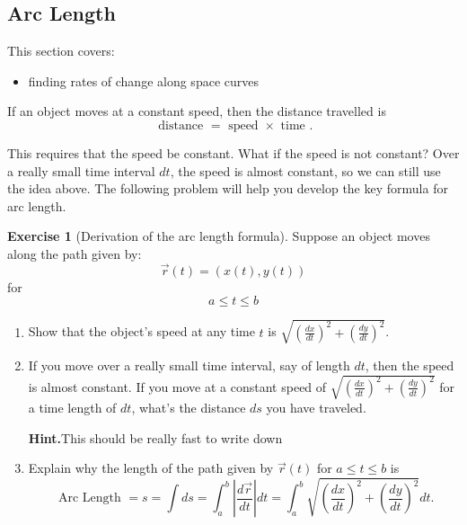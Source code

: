\documentclass[10pt,]{book}
\theoremstyle{plain}
\theoremstyle{definition}
\theoremstyle{definition}
\theoremstyle{definition}
\theoremstyle{definition}
\newtheorem{exploration}[project]{Exercise}
\theoremstyle{definition}
\numberwithin{equation}{section}
\newcommand{\ds}{\displaystyle}
\begin{document}
\subsection[{Arc Length}]{Arc Length}\label{arc_length}
This section covers: \leavevmode%
\begin{itemize}[label=\textbullet]
\item{}finding rates of change along space curves%
\end{itemize}
%
\par
If an object moves at a constant speed, then the distance travelled is%
\begin{equation*}
\text{ distance }  = \text{ speed } \times\text{ time } .
\end{equation*}
%
\par
This requires that the speed be constant. What if the speed is not constant? Over a really small time interval \(dt\), the speed is almost constant, so we can still use the idea above. The following problem will help you develop the key formula for arc length.%
\begin{exploration}[Derivation of the arc length formula]\label{exploration-80}
Suppose an object moves along the path given by:%
\begin{equation*}
\vec r(t)=(x(t),y(t))
\end{equation*}
for%
\begin{equation*}
a\leq t\leq b
\end{equation*}
%
\begin{enumerate}[font=\bfseries,label=(\alph*),ref=\alph*]
\item\label{task-132} Show that the object's speed at any time \(t\) is \(\ds\sqrt{\left(\frac{dx}{dt}\right)^2+\left(\frac{dy}{dt}\right)^2}\).%
\item\label{task-133} If you move over a really small time interval, say of length \(dt\), then the speed is almost constant. If you move at a constant speed of \(\ds\sqrt{\left(\frac{dx}{dt}\right)^2+\left(\frac{dy}{dt}\right)^2}\) for a time length of \(dt\), what's the distance \(ds\) you have traveled.%
\par\medskip\noindent%
\textbf{Hint.}\quad This should be really fast to write down%
\item\label{arc_length_formula} Explain why the length of the path given by \(\vec r(t)\) for \(a\leq t\leq b\) is   %
\begin{equation*}
\text{ Arc Length } =s=\int ds=\int_a^b \left|\frac{d\vec r}{dt}\right| dt=\int_a^b \sqrt{\left(\frac{dx}{dt}\right)^2+\left(\frac{dy}{dt}\right)^2}dt.
\end{equation*}
%
\end{enumerate}
\end{exploration}
\end{document}
